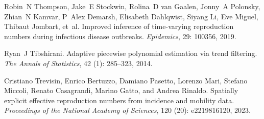 \documentclass[10pt,letterpaper]{article}
\begin{document}
\begin{thebibliography}{23}
  Robin~N Thompson, Jake~E Stockwin, Rolina~D van Gaalen, Jonny~A Polonsky,
    Zhian~N Kamvar, P~Alex Demarsh, Elisabeth Dahlqwist, Siyang Li, Eve Miguel,
    Thibaut Jombart, et~al.
  \newblock Improved inference of time-varying reproduction numbers during
    infectious disease outbreaks.
  \newblock \emph{Epidemics}, 29: 100356, 2019.
  
  Ryan~J Tibshirani.
  \newblock Adaptive piecewise polynomial estimation via trend filtering.
  \newblock \emph{The Annals of Statistics}, 42 (1): 285--323,
    2014.
  
  Cristiano Trevisin, Enrico Bertuzzo, Damiano Pasetto, Lorenzo Mari, Stefano
    Miccoli, Renato Casagrandi, Marino Gatto, and Andrea Rinaldo.
  \newblock Spatially explicit effective reproduction numbers from incidence and
    mobility data.
  \newblock \emph{Proceedings of the National Academy of Sciences}, 120
    (20): e2219816120, 2023.
  
\end{thebibliography}
  
%
\end{document}
